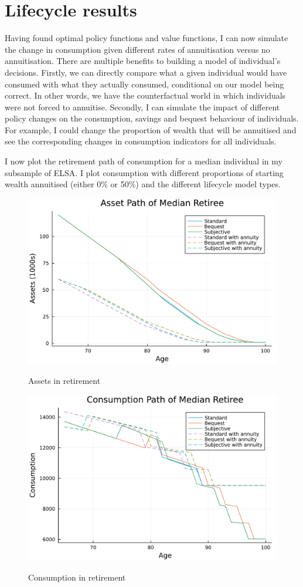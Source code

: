 \documentclass[12pt]{article}
\begin{document}
\section{Lifecycle results}

Having found optimal policy functions and value functions, I can now simulate the
change in consumption given different rates of annuitisation versus no
annuitisation. There are multiple benefits to building a model of individual's
decisions. Firstly, we can directly compare what a given individual would have
consumed with what they actually consumed, conditional on our model being
correct. In other words, we have the counterfactual world in which individuals
were not forced to annuitise. Secondly, I can simulate the impact of different
policy changes on the consumption, savings and bequest behaviour of individuals.
For example, I could change the proportion of wealth that will be annuitised and
see the corresponding changes in consumption indicators for all individuals.

I now plot the retirement path of consumption for a median individual in my
subsample of ELSA. I plot consumption with different proportions of starting wealth
annuitised (either 0\% or 50\%) and the different lifecycle model types.

\begin{figure}[h]
    \caption{Assets in retirement}
    \centering
    \includegraphics[width=0.7\columnwidth]{figures/asset_plot_median_retiree.pdf}
    \label{fig:AssetPlot}
\end{figure}
\begin{figure}[h]
    \caption{Consumption in retirement}
    \centering
    \includegraphics[width=0.7\columnwidth]{figures/consumption_plot_median_retiree.pdf}
    \label{fig:ConsumpPlot}
\end{figure}
\end{document}
